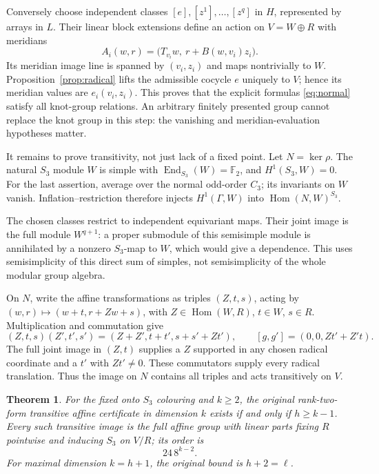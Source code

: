 \documentclass[11pt]{article}
\newtheorem{theorem}{Theorem}
\newcommand{\F}{\mathbb F}
\begin{document}
Conversely choose independent classes $[e],[z^1],\ldots,[z^q]$
in $H$, represented by arrays in $L$. Their linear block
extensions define an action on $V=W\oplus R$ with meridians
\[
 A_i(w,r)=\bigl(T_{v_i}w,\ r+B(w,v_i)z_i\bigr).
\]
Its meridian image line is spanned by $(v_i,z_i)$ and maps
nontrivially to $W$. Proposition~\ref{prop:radical} lifts the
admissible cocycle $e$ uniquely to $V$; hence its meridian values
are $e_i(v_i,z_i)$. This proves that the explicit formulas
\eqref{eq:normal} satisfy all knot-group relations. An arbitrary
finitely presented group cannot replace the knot group in this
step: the vanishing and meridian-evaluation hypotheses matter.

It remains to prove transitivity, not just lack of a fixed point.
Let $N=\ker\rho$. The natural $S_3$ module $W$ is simple with
$\operatorname{End}_{S_3}(W)=\F_2$, and $H^1(S_3,W)=0$.
For the last assertion, average over the normal odd-order $C_3$;
its invariants on $W$ vanish. Inflation--restriction therefore
injects $H^1(\Gamma,W)$ into
$\operatorname{Hom}(N,W)^{S_3}$.

The chosen classes restrict to independent equivariant maps.
Their joint image is the full module $W^{q+1}$: a proper
submodule of this semisimple module is annihilated by a nonzero
$S_3$-map to $W$, which would give a dependence. This uses
semisimplicity of this direct sum of simples, not semisimplicity
of the whole modular group algebra.

On $N$, write the affine transformations as triples $(Z,t,s)$,
acting by $(w,r)\mapsto(w+t,r+Zw+s)$, with
$Z\in\operatorname{Hom}(W,R)$, $t\in W$, $s\in R$. Multiplication
and commutation give
\[
 (Z,t,s)(Z',t',s')=(Z+Z',t+t',s+s'+Zt'),
 \qquad [g,g']=(0,0,Zt'+Z't).
\]
The full joint image in $(Z,t)$ supplies a $Z$ supported in any
chosen radical coordinate and a $t'$ with $Zt'\ne0$.
These commutators supply every radical translation. Thus the
image on $N$ contains all triples and acts transitively on $V$.

\begin{theorem}\label{thm:equivalence}
For the fixed onto $S_3$ colouring and $k\ge2$, the original
rank-two-form transitive affine certificate in dimension $k$
exists if and only if $h\ge k-1$. Every such transitive image
is the full affine group with linear parts fixing $R$ pointwise
and inducing $S_3$ on $V/R$; its order is
\[
                     24\,8^{k-2}.
\]
For maximal dimension $k=h+1$, the original bound is $h+2=\ell$.
\end{theorem}
\end{document}

